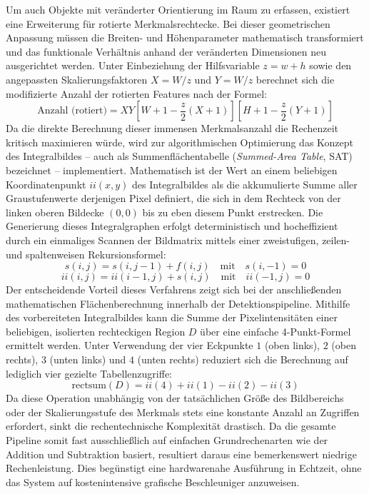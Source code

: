 Um auch Objekte mit veränderter Orientierung im Raum zu erfassen, existiert eine Erweiterung für rotierte Merkmalsrechtecke. Bei dieser geometrischen Anpassung müssen die Breiten- und Höhenparameter mathematisch transformiert und das funktionale Verhältnis anhand der veränderten Dimensionen neu ausgerichtet werden. Unter Einbeziehung der Hilfsvariable $z = w + h$ sowie den angepassten Skalierungsfaktoren $X = W/z$ und $Y = W/z$ berechnet sich die modifizierte Anzahl der rotierten Features nach der Formel:
\begin{equation}
\text{Anzahl (rotiert)} = X Y \left[ W + 1 - \frac{z}{2}(X + 1) \right] \left[ H + 1 - \frac{z}{2}(Y + 1) \right]
\label{Anzahl rotierte Features}
\end{equation}
Da die direkte Berechnung dieser immensen Merkmalsanzahl die Rechenzeit kritisch maximieren würde, wird zur algorithmischen Optimierung das Konzept des Integralbildes – auch als Summenflächentabelle (\textit{Summed-Area Table}, SAT) bezeichnet – implementiert. Mathematisch ist der Wert an einem beliebigen Koordinatenpunkt $ii(x, y)$ des Integralbildes als die akkumulierte Summe aller Graustufenwerte derjenigen Pixel definiert, die sich in dem Rechteck von der linken oberen Bildecke $(0,0) $ bis zu eben diesem Punkt erstrecken. Die Generierung dieses Integralgraphen erfolgt deterministisch und hocheffizient durch ein einmaliges Scannen der Bildmatrix mittels einer zweistufigen, zeilen- und spaltenweisen Rekursionsformel:
\begin{equation}
s(i,j) = s(i,j-1) + f(i,j) \quad \text{mit} \quad s(i,-1) = 0
\label{Rekursionsformel 1}
\end{equation}
\begin{equation}
ii(i,j) = ii(i-1,j) + s(i,j) \quad \text{mit} \quad ii(-1,j) = 0
\label{Flächenberechnung}
\end{equation}
Der entscheidende Vorteil dieses Verfahrens zeigt sich bei der anschließenden mathematischen Flächenberechnung innerhalb der Detektionspipeline. Mithilfe des vorbereiteten Integralbildes kann die Summe der Pixelintensitäten einer beliebigen, isolierten rechteckigen Region $D$ über eine einfache 4-Punkt-Formel ermittelt werden. Unter Verwendung der vier Eckpunkte $1$ (oben links), $2$ (oben rechts), $3$ (unten links) und $4$ (unten rechts) reduziert sich die Berechnung auf lediglich vier gezielte Tabellenzugriffe:
\begin{equation}
\text{rectsum}(D) = ii(4) + ii(1) - ii(2) - ii(3)
\label{Rechtecksumme}
\end{equation} 
Da diese Operation unabhängig von der tatsächlichen Größe des Bildbereichs oder der Skalierungsstufe des Merkmals stets eine konstante Anzahl an Zugriffen erfordert, sinkt die rechentechnische Komplexität drastisch. Da die gesamte Pipeline somit fast ausschließlich auf einfachen Grundrechenarten wie der Addition und Subtraktion basiert, resultiert daraus eine bemerkenswert niedrige Rechenleistung. Dies begünstigt eine hardwarenahe Ausführung in Echtzeit, ohne das System auf kostenintensive grafische Beschleuniger anzuweisen. \cite{smarter_violajones_2018}

